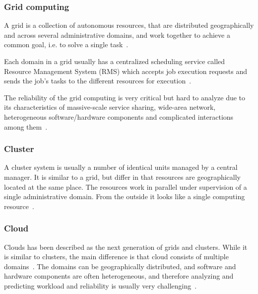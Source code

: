 \documentclass{cslthse-msc}
\begin{document}
\subsubsection{Grid computing}
A grid is a collection of autonomous resources, that are distributed geographically and across several administrative domains, and work together to achieve a common goal, i.e. to solve a single task~\cite{compStudyLoadAndCloud, relAndPerfGridServices, evalOfGridRel}.

Each domain in a grid usually has a centralized scheduling service called Resource Management System (RMS) which accepts job execution requests and sends the job's tasks to the different resources for execution~\cite{evalOfGridRel}.

The reliability of the grid computing is very critical but hard to analyze due to its characteristics of massive-scale service sharing, wide-area network, heterogeneous software/hardware components and complicated interactions among them~\cite{cloudServiceRel}.


\subsubsection{Cluster}
A cluster system is usually a number of identical units managed by a central manager. It is similar to a grid, but differ in that resources are geographically located at the same place. The resources work in parallel under supervision of a single administrative domain. From the outside it looks like a single computing resource~\cite{compStudyLoadAndCloud}.

\subsubsection{Cloud}
Clouds has been described as the next generation of grids and clusters. While it is similar to clusters, the main difference is that cloud consists of multiple domains~\cite{compStudyLoadAndCloud}. The domains can be geographically distributed, and software and hardware components are often heterogeneous, and therefore analyzing and predicting workload and reliability is usually very challenging~\cite{surveyReliabilityDistr}.
\end{document}
